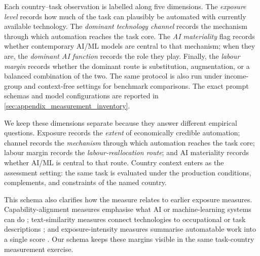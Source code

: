 \documentclass[11pt]{article}
\begin{document}
Each country--task observation is labelled along five dimensions. The \textit{exposure level} records how much of the task can plausibly be automated with currently available technology. The \textit{dominant technology channel} records the mechanism through which automation reaches the task core. The \textit{AI materiality} flag records whether contemporary AI/ML models are central to that mechanism; when they are, the \textit{dominant AI function} records the role they play. Finally, the \textit{labour margin} records whether the dominant route is substitution, augmentation, or a balanced combination of the two. The same protocol is also run under income-group and context-free settings for benchmark comparisons. The exact prompt schemas and model configurations are reported in \ref{sec:appendix_measurement_inventory}.

We keep these dimensions separate because they answer different empirical questions. Exposure records the \emph{extent} of economically credible automation; channel records the \emph{mechanism} through which automation reaches the task core; labour margin records the \emph{labour-reallocation route}; and AI materiality records whether AI/ML is central to that route. Country context enters as the assessment setting: the same task is evaluated under the production conditions, complements, and constraints of the named country.

This schema also clarifies how the measure relates to earlier exposure measures. Capability-alignment measures emphasise what AI or machine-learning systems can do \citep{felten2021occupational,BrynjolfssonMitchellRock2018}; text-similarity measures connect technologies to occupational or task descriptions \citep{Webb2020}; and exposure-intensity measures summarise automatable work into a single score \citep{frey2017future,EloundouEtAl2024}. Our schema keeps these margins visible in the same task-country measurement exercise.
\end{document}
